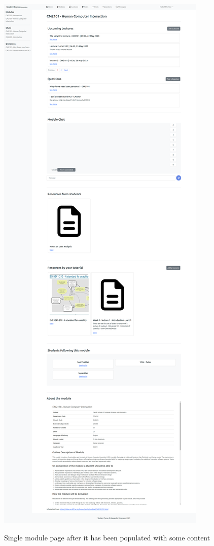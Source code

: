\includegraphics[scale=0.12]{images/application/33 - module_page_populated.png}

Single module page after it has been populated with some content

